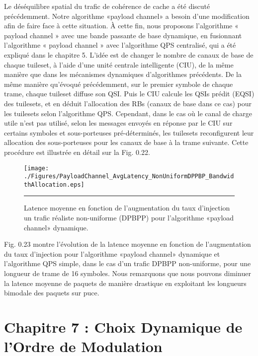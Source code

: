 Le déséquilibre spatial du trafic de cohérence de cache a été discuté précédemment. Notre algorithme «payload channel» a besoin d'une modification afin de faire face à cette situation. À cette fin, nous proposons l'algorithme « payload channel » avec une bande passante de base dynamique, en fusionnant l'algorithme « payload channel » avec l'algorithme QPS centralisé, qui a été expliqué dans le chapitre 5. L'idée est de changer le nombre de canaux de base de chaque tuileset, à l'aide d'une unité centrale intelligente (CIU), de la même manière que dans les mécanismes dynamiques d'algorithmes précédents. De la même manière qu’évoqué précédemment, sur le premier symbole de chaque trame, chaque tuileset diffuse son QSI. Puis le CIU calcule les QSIs prédit (EQSI) des tuilesets, et en déduit l’allocation des RBs (canaux de base dans ce cas) pour les tuilesets selon l'algorithme QPS. Cependant, dans le cas où le canal de charge utile n’est pas utilisé, selon les messages envoyés en réponse par le CIU sur certains symboles et sous-porteuses pré-déterminés, les tuilesets reconfigurent leur allocation des sous-porteuses pour les canaux de base à la trame suivante. Cette procédure est illustrée en détail sur la Fig. 0.22. 


\begin{figure}[htbp]
  \centering
    \texttt{[image: ./Figures/PayloadChannel\_AvgLatency\_NonUniformDPPBP\_BandwidthAllocation.eps]}
    \rule{35em}{0.5pt}
  \caption[Latence moyenne en fonction de l'augmentation du taux d'injection un trafic réaliste non-uniforme (DPBPP) pour l'algorithme «payload channel» dynamique.]{Latence moyenne en fonction de l'augmentation du taux d'injection un trafic réaliste non-uniforme (DPBPP) pour l'algorithme «payload channel» dynamique.}
  \label{fig:Electron}
\end{figure}

Fig. 0.23 montre l’évolution de la latence moyenne en fonction de l'augmentation du taux d'injection pour l’algorithme «payload channel» dynamique et l'algorithme QPS simple, dans le cas d’un trafic DPBPP non-uniforme, pour une longueur de trame de 16 symboles. Nous remarquons que nous pouvons diminuer la latence moyenne de paquets de manière drastique en exploitant les longueurs bimodale des paquets sur puce.

\section*{Chapitre 7 : Choix Dynamique de l'Ordre de Modulation}

